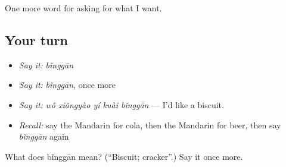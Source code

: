 \begin{grammarlens}[title={What you've built}]
One more word for asking for what I want.
\end{grammarlens}

\subsection*{Your turn}
\begin{itemize}
\raggedright
  \item \emph{Say it:} \emph{bǐnggān}
  \item \emph{Say it:} \emph{bǐnggān}, once more
  \item \emph{Say it:} \emph{wǒ xiǎngyào yí kuài bǐnggān} — I'd like a biscuit.
  \item \emph{Recall:} say the Mandarin for cola, then the Mandarin for beer, then say \emph{bǐnggān} again
\end{itemize}

\begin{tcolorbox}[breakable,colback=teal!4,colframe=teal!35!black,title={Before you move on}]
What does bǐnggān mean? (\textquotedblleft{}Biscuit; cracker\textquotedblright{}.) Say it once more.
\end{tcolorbox}
